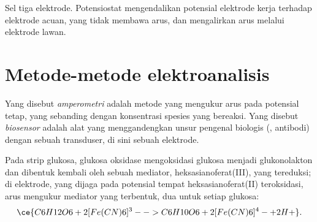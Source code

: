 \begin{omfigure}

{\small Sel tiga elektrode. Potensiostat mengendalikan potensial elektrode
kerja terhadap elektrode acuan, yang tidak membawa arus, dan mengalirkan arus
melalui elektrode lawan.}
\end{omfigure}

\section{Metode-metode elektroanalisis}

\begin{definition}\label{def:b3:electrode-kinetics:amperometry}
Yang disebut \emph{amperometri} adalah metode yang mengukur
arus pada potensial tetap, yang sebanding dengan konsentrasi spesies yang
bereaksi. Yang disebut \emph{biosensor} adalah alat yang
menggandengkan unsur pengenal biologis (, antibodi) dengan sebuah
transduser, di sini sebuah elektrode.
\end{definition}

Pada strip glukosa, glukosa oksidase mengoksidasi glukosa menjadi
glukonolakton dan dibentuk kembali oleh sebuah mediator, heksasianoferat(III),
yang tereduksi; di elektrode, yang dijaga pada potensial tempat
heksasianoferat(II) teroksidasi, arus mengukur mediator yang terbentuk, dua
untuk setiap glukosa:
\[
  \ce{C6H12O6 + 2 [Fe(CN)6]^3- -> C6H10O6 + 2 [Fe(CN)6]^4- + 2 H+} .
\]

